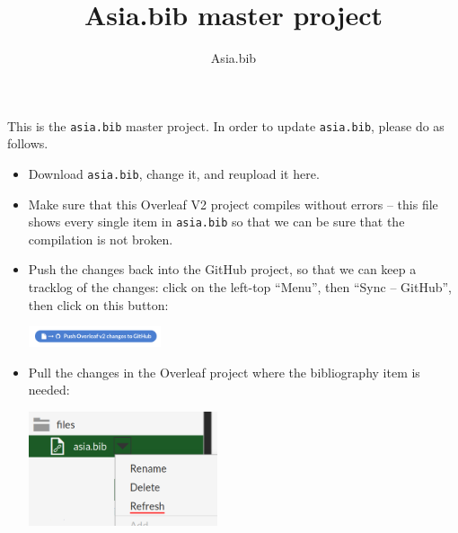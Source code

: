 \documentclass[xetex, svgnames, 12pt]{scrartcl}
\title{Asia.bib master project}
\author{Asia.bib}
\begin{document}
\maketitle

This is the \verb=asia.bib= master project. In order to update \verb=asia.bib=, please do as follows.

\begin{itemize}
\item Download \verb=asia.bib=, change it, and reupload it here.
\item Make sure that this Overleaf V2 project compiles without errors -- this file shows every single item in \verb=asia.bib= so that we can be sure that the compilation is not broken.
\item Push the changes back into the GitHub project, so that we can keep a tracklog of the changes: click on the left-top ``Menu'', then ``Sync -- GitHub'', then click on this button:
\begin{center}
\includegraphics[width=10.5em]{a.png}
\end{center}
\item Pull the changes in the Overleaf project where the bibliography item is needed:
\begin{center}
\includegraphics[width=15em]{refresh.png}
\end{center}
\end{itemize}

\nocite{*} %



\end{document}
